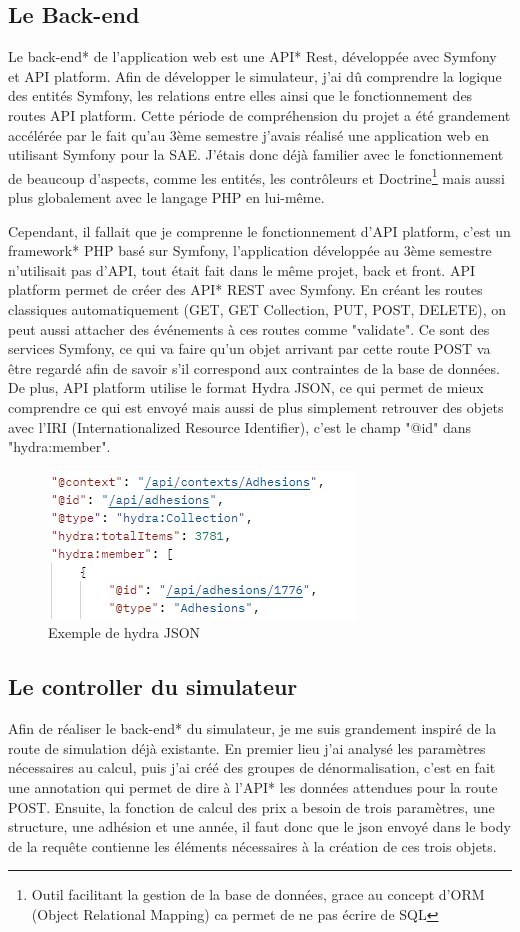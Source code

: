 \documentclass[a4paper,12pt]{report}
\begin{document}
\subsection{Le Back-end}
Le back-end* de l'application web est une API* Rest, développée avec Symfony et API platform. Afin de développer le simulateur, j'ai dû comprendre la logique des entités Symfony, les relations entre elles ainsi que le fonctionnement des routes API platform. Cette période de compréhension du projet a été grandement accélérée par le fait qu'au 3ème semestre j'avais réalisé une application web en utilisant Symfony pour la SAE. J'étais donc déjà familier avec le fonctionnement de beaucoup d'aspects, comme les entités, les contrôleurs et Doctrine\footnote{Outil facilitant la gestion de la base de données, grace au concept d'ORM (Object Relational Mapping) ca permet de ne pas écrire de SQL} mais aussi plus globalement avec le langage PHP en lui-même.

Cependant, il fallait que je comprenne le fonctionnement d'API platform, c'est un framework* PHP basé sur Symfony, l'application développée au 3ème semestre n'utilisait pas d'API, tout était fait dans le même projet, back et front. API platform permet de créer des API* REST avec Symfony. En créant les routes classiques automatiquement (GET, GET Collection, PUT, POST, DELETE), on peut aussi attacher des événements à ces routes comme "validate". Ce sont des services Symfony, ce qui va faire qu'un objet arrivant par cette route POST va être regardé afin de savoir s'il correspond aux contraintes de la base de données. De plus, API platform utilise le format Hydra JSON, ce qui permet de mieux comprendre ce qui est envoyé mais aussi de plus simplement retrouver des objets avec l'IRI (Internationalized Resource Identifier), c'est le champ "@id" dans "hydra:member".

\begin{figure}[ht]
    \centering
    \includegraphics[scale=0.8]{hydraJSON.png}
    \caption{Exemple de hydra JSON}
    \label{fig:hyda-json}
\end{figure}

\subsection{Le controller du simulateur}
Afin de réaliser le back-end* du simulateur, je me suis grandement inspiré de la route de simulation déjà existante. En premier lieu j'ai analysé les paramètres nécessaires au calcul, puis j'ai créé des groupes de dénormalisation, c'est en fait une annotation qui permet de dire à l'API* les données attendues pour la route POST. Ensuite, la fonction de calcul des prix a besoin de trois paramètres, une structure, une adhésion et une année, il faut donc que le json envoyé dans le body de la requête contienne les éléments nécessaires à la création de ces trois objets.
\end{document}
